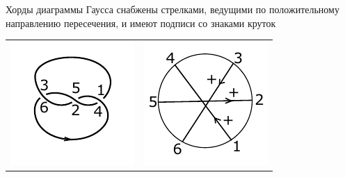 Хорды диаграммы Гаусса снабжены стрелками, ведущими по положительному направлению пересечения, и имеют подписи со знаками круток

\begin{tabular}{
>{\centering\arraybackslash}m{3cm}
>{\centering\arraybackslash}m{3cm}
}
\includegraphics{images/sample-simple-knot.pdf}
&
\includegraphics{images/sample-simple-knot-gauss.pdf}
\end{tabular}
